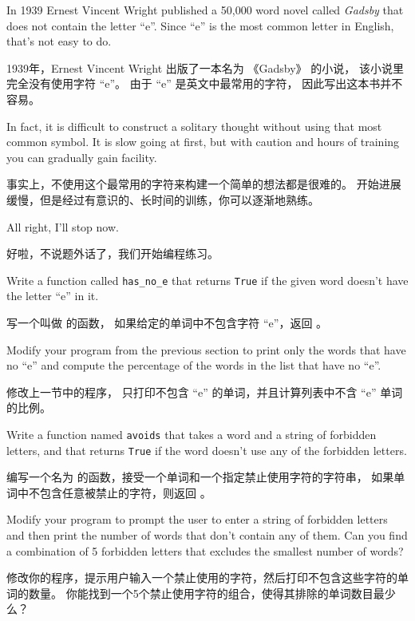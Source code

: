 \begin{exercise}

In 1939 Ernest Vincent Wright published a 50,000 word novel called
{\em Gadsby} that does not contain the letter ``e''.  Since ``e'' is
the most common letter in English, that's not easy to do.

1939年，Ernest Vincent Wright 出版了一本名为 《Gadsby》 的小说，
该小说里完全没有使用字符 ``e''。 由于 ``e'' 是英文中最常用的字符， 因此写出这本书并不容易。

In fact, it is difficult to construct a solitary thought without using
that most common symbol.  It is slow going at first, but with caution
and hours of training you can gradually gain facility.

事实上，不使用这个最常用的字符来构建一个简单的想法都是很难的。
开始进展缓慢，但是经过有意识的、长时间的训练，你可以逐渐地熟练。

All right, I'll stop now.

好啦，不说题外话了，我们开始编程练习。

Write a function called \verb"has_no_e" that returns {\tt True} if
the given word doesn't have the letter ``e'' in it.

写一个叫做  的函数， 如果给定的单词中不包含字符 ``e''，返回  。

Modify your program from the previous section to print only the words
that have no ``e'' and compute the percentage of the words in the list
that have no ``e''.

修改上一节中的程序， 只打印不包含 ``e'' 的单词，并且计算列表中不含 ``e'' 单词的比例。

\end{exercise}


\begin{exercise}

Write a function named {\tt avoids}
that takes a word and a string of forbidden letters, and
that returns {\tt True} if the word doesn't use any of the forbidden
letters.

编写一个名为  的函数，接受一个单词和一个指定禁止使用字符的字符串，
如果单词中不包含任意被禁止的字符，则返回  。

Modify your program to prompt the user to enter a string
of forbidden letters and then print the number of words that
don't contain any of them.
Can you find a combination of 5 forbidden letters that
excludes the smallest number of words?

修改你的程序，提示用户输入一个禁止使用的字符，然后打印不包含这些字符的单词的数量。
你能找到一个5个禁止使用字符的组合，使得其排除的单词数目最少么？

\end{exercise}



